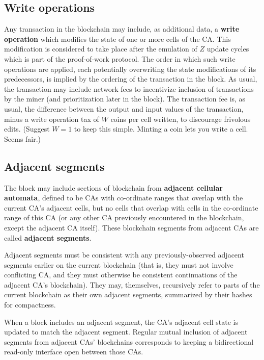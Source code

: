 \documentclass{article}
\begin{document}
\subsection{Write operations}

Any transaction in the blockchain may include, as additional data,
a {\bf write operation} which modifies the state of one or more cells of the CA.
This modification is considered to take place after the emulation of $Z$ update cycles
which is part of the proof-of-work protocol.
The order in which such write operations are applied,
each potentially overwriting the state modifications of its predecessors,
is implied by the ordering of the transaction in the block.
As usual, the transaction may include network fees to incentivize inclusion of transactions
by the miner
(and prioritization later in the block).
The transaction fee is, as usual, the difference between the output and input values of the transaction,
minus a write operation tax of $W$ coins per cell written,
to discourage frivolous edits.
(Suggest $W=1$ to keep this simple.
Minting a coin lets you write a cell.
Seems fair.)

\subsection{Adjacent segments}

The block may include sections of blockchain from {\bf adjacent cellular automata},
defined to be CAs with co-ordinate ranges that
overlap with the current CA's adjacent cells,
but no cells that overlap with
cells in the co-ordinate range of this CA (or any other CA previously encountered in the blockchain,
except the adjacent CA itself).
These blockchain segments from adjacent CAs are called {\bf adjacent segments}.

Adjacent segments must be consistent with any previously-observed adjacent segments
earlier on the current blockchain (that is, they must not involve conflicting CA,
and they must otherwise be consistent continuations of the adjacent CA's blockchain).
They may, themselves, recursively refer to parts of the current blockchain as their own adjacent segments,
summarized by their hashes for compactness.

When a block includes an adjacent segment, the CA's adjacent cell state is updated to match the adjacent segment.
Regular mutual inclusion of adjacent segments from adjacent CAs' blockchains
corresponds to keeping a bidirectional read-only interface open between those CAs.
\end{document}
